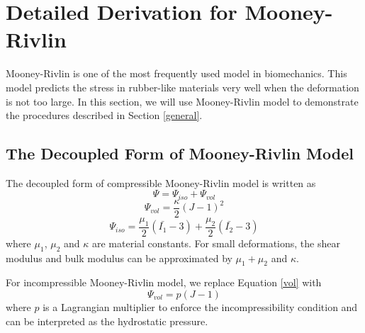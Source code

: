 \section{Detailed Derivation for Mooney-Rivlin}
Mooney-Rivlin is one of the most frequently used model in biomechanics. This model predicts the stress in rubber-like materials very well when the deformation is not too large. In this section, we will use Mooney-Rivlin model to demonstrate the procedures described in Section \ref{general}. 

%
\subsection{The Decoupled Form of Mooney-Rivlin Model}
The decoupled form of compressible Mooney-Rivlin model is written as
\begin{equation}
\Psi = \Psi_{iso} + \Psi_{vol}
\end{equation}
\begin{equation} \label{vol}
\Psi_{vol} = \frac{\kappa}{2}(J - 1)^2
\end{equation}
\begin{equation} \label{iso}
\Psi_{iso} = \frac{\mu_1}{2}(\bar{I_1} - 3) + \frac{\mu_2}{2}(\bar{I_2} - 3)
\end{equation}
where $\mu_1$, $\mu_2$ and $\kappa$ are material constants. For small deformations, the shear modulus and bulk modulus can be approximated by $\mu_1+\mu_2$ and $\kappa$.

For incompressible Mooney-Rivlin model, we replace Equation \ref{vol} with
\begin{equation}
\Psi_{vol} = p(J - 1)
\end{equation}
where $p$ is a Lagrangian multiplier to enforce the incompressibility condition and can be interpreted as the hydrostatic pressure.  

%
